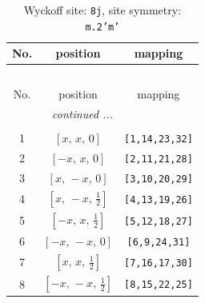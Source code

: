 \documentclass[fleqn,8pt]{jsarticle}
\begin{document}
\begin{longtable}{ccc}
\caption{Wyckoff site: {\tt 8j}, site symmetry: {\tt m.2'm'}}
 \\
 \hline \hline
No. & position & mapping \\ \hline \endfirsthead

\multicolumn{2}{l}{\tablename\ \thetable{}} \\
 \hline \hline
No. & position & mapping \\ \hline \endhead

 \hline \hline
\multicolumn{2}{r}{\footnotesize\it continued ...} \\ \endfoot

 \hline \hline
\multicolumn{2}{r}{} \\ \endlastfoot

1 & $\left[ x,\, x,\, 0 \right]$ & {\tt [1,14,23,32]} \\ \hline
2 & $\left[ - x,\, x,\, 0 \right]$ & {\tt [2,11,21,28]} \\ \hline
3 & $\left[ x,\, - x,\, 0 \right]$ & {\tt [3,10,20,29]} \\ \hline
4 & $\left[ x,\, - x,\, \frac{1}{2} \right]$ & {\tt [4,13,19,26]} \\ \hline
5 & $\left[ - x,\, x,\, \frac{1}{2} \right]$ & {\tt [5,12,18,27]} \\ \hline
6 & $\left[ - x,\, - x,\, 0 \right]$ & {\tt [6,9,24,31]} \\ \hline
7 & $\left[ x,\, x,\, \frac{1}{2} \right]$ & {\tt [7,16,17,30]} \\ \hline
8 & $\left[ - x,\, - x,\, \frac{1}{2} \right]$ & {\tt [8,15,22,25]} \\
\end{longtable}
\renewcommand{\arraystretch}{1.2}
\end{document}
